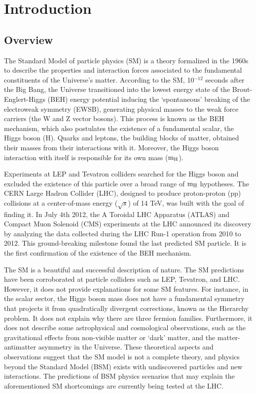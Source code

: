 \chapter{Introduction} \label{hhproduction}  %
\section{Overview}
The Standard Model of particle physics (SM) is a theory formalized in the 1960s to describe the properties and interaction forces associated to the fundamental constituents of the Universe's matter. According to the SM, 10$^{-12}$ seconds after the Big Bang, the Universe transitioned into the lowest energy state of the Brout-Englert-Higgs (BEH) energy potential inducing the `spontaneous' breaking of the electroweak symmetry (EWSB), generating physical masses to the weak force carriers (the W and Z vector bosons). This process is known as the BEH mechanism, which also postulates the existence of a fundamental scalar, the Higgs boson (H). Quarks and leptons, the building blocks of matter, obtained their masses from their interactions with it. Moreover, the Higgs boson interaction with itself is responsible for its own mass ($\mathrm{m_{H}}$).

Experiments at LEP and Tevatron colliders searched for the Higgs boson and excluded the existence of this particle over a broad range of $\mathrm{m_{H}}$ hypotheses. The CERN Large Hadron Collider (LHC), designed to produce proton-proton (pp) collisions at a center-of-mass energy ($\sqrt{s}$) of 14 TeV, was built with the goal of finding it. In July 4th 2012, the A Toroidal LHC Apparatus (ATLAS) and Compact Muon Solenoid (CMS) experiments at the LHC announced its discovery by analyzing the data collected during the LHC Run-1 operation from 2010 to 2012. This ground-breaking milestone found the last predicted SM particle. It is the first confirmation of the existence of the BEH mechanism.

The SM is a beautiful and successful description of nature. The SM predictions have been corroborated at particle colliders such as LEP, Tevatron, and LHC.  However, it does not provide explanations for some SM features. For instance, in the scalar sector, the Higgs boson mass does not have a fundamental symmetry that projects it from quadratically divergent corrections, known as the Hierarchy problem. It does not explain why there are three fermion families. Furthermore, it does not describe some astrophysical and cosmological observations, such as the gravitational effects from non-visible matter or `dark' matter, and the matter-antimatter asymmetry in the Universe. These theoretical aspects and observations suggest that the SM model is not a complete theory, and physics beyond the Standard Model (BSM) exists with undiscovered particles and new interactions. The predictions of BSM physics scenarios that may explain the aforementioned SM shortcomings are currently being tested at the LHC.

